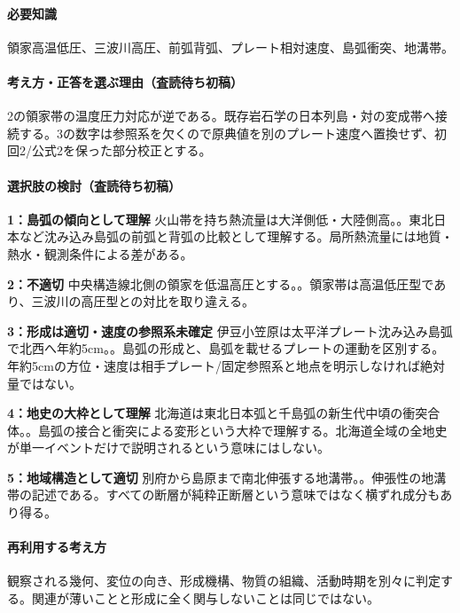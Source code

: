 \paragraph{必要知識} 領家高温低圧、三波川高圧、前弧背弧、プレート相対速度、島弧衝突、地溝帯。

\paragraph{考え方・正答を選ぶ理由（査読待ち初稿）} 2の領家帯の温度圧力対応が逆である。既存岩石学の日本列島・対の変成帯へ接続する。3の数字は参照系を欠くので原典値を別のプレート速度へ置換せず、初回2/公式2を保った部分校正とする。

\paragraph{選択肢の検討（査読待ち初稿）}\mbox{}\par

\noindent\textbf{1：島弧の傾向として理解} 火山帯を持ち熱流量は大洋側低・大陸側高。。東北日本など沈み込み島弧の前弧と背弧の比較として理解する。局所熱流量には地質・熱水・観測条件による差がある。\par

\noindent\textbf{2：不適切} 中央構造線北側の領家を低温高圧とする。。領家帯は高温低圧型であり、三波川の高圧型との対比を取り違える。\par

\noindent\textbf{3：形成は適切・速度の参照系未確定} 伊豆小笠原は太平洋プレート沈み込み島弧で北西へ年約5cm。。島弧の形成と、島弧を載せるプレートの運動を区別する。年約5cmの方位・速度は相手プレート/固定参照系と地点を明示しなければ絶対量ではない。\par

\noindent\textbf{4：地史の大枠として理解} 北海道は東北日本弧と千島弧の新生代中頃の衝突合体。。島弧の接合と衝突による変形という大枠で理解する。北海道全域の全地史が単一イベントだけで説明されるという意味にはしない。\par

\noindent\textbf{5：地域構造として適切} 別府から島原まで南北伸張する地溝帯。。伸張性の地溝帯の記述である。すべての断層が純粋正断層という意味ではなく横ずれ成分もあり得る。\par

\paragraph{再利用する考え方} 観察される幾何、変位の向き、形成機構、物質の組織、活動時期を別々に判定する。関連が薄いことと形成に全く関与しないことは同じではない。

